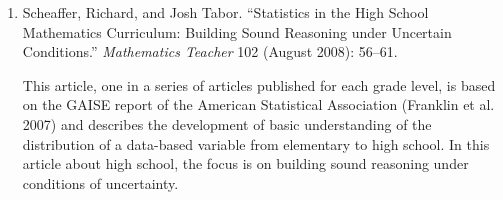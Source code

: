{{\begin{enumerate}
          \par\noindent\hspace*{1em} This article, one in a series of articles published for each grade level, is based on the GAISE report of the American Statistical Association (Franklin et al. 2007) and describes the development of basic understanding of the distribution of a data-based variable from elementary to high school. In this article about middle school, the focus is on understanding center and spread. The authors discuss several different mathematical tasks used in classrooms, as well as students' responses.\vspace{.35\baselineskip}

        \item Scheaffer, Richard, and Josh Tabor. ``Statistics in the High School Mathematics Curriculum: Building Sound Reasoning under Uncertain Conditions.'' \emph{Mathematics Teacher} 102 (August 2008): 56--61.\vspace{.25\baselineskip}

          \par\noindent\hspace*{1em} This article, one in a series of articles published for each grade level, is based on the GAISE report of the American Statistical Association (Franklin et al. 2007) and describes the development of basic understanding of the distribution of a data-based variable from elementary to high school. In this article about high school, the focus is on building sound reasoning under conditions of uncertainty.
      \end{enumerate}}
  }

